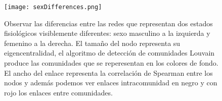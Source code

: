 \documentclass[twoside,twocolumn]{article}
\begin{document}
\begin{figure}
  \texttt{[image: sexDifferences.png]}
  \caption{Observar las diferencias entre las redes que representan dos estados fisiológicos visiblemente diferentes: sexo masculino a la izquierda y femenino a la derecha. El tamaño del nodo representa su eigencentralidad, el algoritmo de detección de comunidades Louvain produce las comunidades que se reperesentan en los colores de fondo. El ancho del enlace representa la correlación de Spearman entre los nodos y además podemos ver enlaces intracomunidad en negro y con rojo los enlaces entre comunidades.}
  \label{fig:sexDifferences}
\end{figure}
\end{document}
